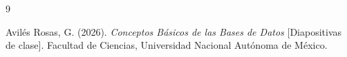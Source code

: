 \newpage
\renewcommand{\refname}{\section{Referencias}}
\begin{thebibliography}{9}

Avilés Rosas, G. (2026). \textit{Conceptos Básicos de las Bases de Datos} [Diapositivas de clase]. Facultad de Ciencias, Universidad Nacional Autónoma de México.
\end{thebibliography}
